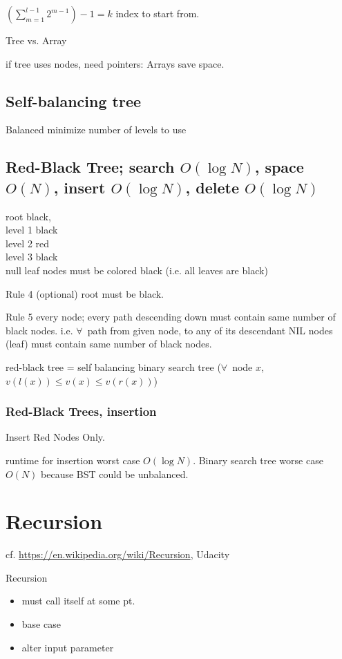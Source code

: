 \documentclass[10pt]{amsart}
\begin{document}
\begin{multicols*}{2}
$\left(\sum_{m=1}^{l-1} 2^{m-1} \right) - 1 = k$ index to start from. 

Tree vs. Array

if tree uses nodes, need pointers: Arrays save space. 

\subsection{Self-balancing tree}

Balanced minimize number of levels to use

\subsection{Red-Black Tree; search $O(\log{N})$, space $O(N)$, insert $O(\log{N})$, delete $O(\log{N})$ }

root black, \\
level 1 black \\
level 2 red \\
level 3 black \\

null leaf nodes must be colored black (i.e. all leaves are black)

Rule 4 (optional) root must be black.

Rule 5 every node; every path descending down must contain same number of black nodes. i.e. $\forall\, $ path from given node, to any of its descendant NIL nodes (leaf) must contain same number of black nodes. 

red-black tree = self balancing binary search tree ($\forall \, $ node $x$, $v(l(x)) \leq v(x) \leq v(r(x))$)

\subsubsection{Red-Black Trees, insertion}

Insert Red Nodes Only. 

runtime for insertion worst case $O(\log{N})$. Binary search tree worse case $O(N)$ because BST could be unbalanced. 


\section{Recursion}

cf. \url{https://en.wikipedia.org/wiki/Recursion},  Udacity 

Recursion
\begin{itemize}
	\item must call itself at some pt.
	\item base case
	\item alter input parameter
\end{itemize}


\end{multicols*}
\end{document}
